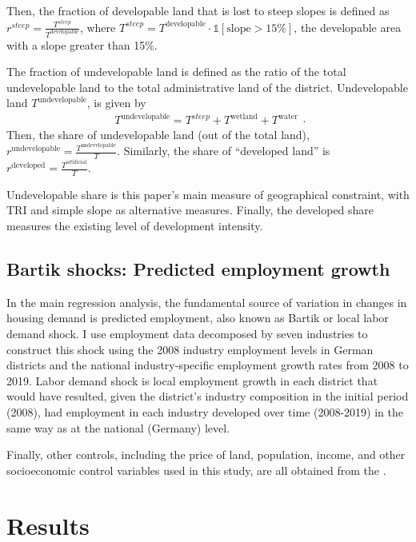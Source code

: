 \documentclass[
  12pt,
]{article}
\begin{document}
Then, the fraction of developable land that is lost to steep slopes is defined as \(r^{steep} = \frac{T^{steep}}{T^{\text{developable}}}\), where \(T^{steep} = T^{\text{developable}} \cdot\mathbb{1}\left[{\text{slope} > 15\%}\right]\), the developable area with a slope greater than 15\%.

The fraction of undevelopable land is defined as the ratio of the total undevelopable land to the total administrative land of the district. Undevelopable land \(T^{\text{undevelopable}}\), is given by \[
\begin{aligned}
T^{\text{undevelopable}} = T^{steep} + T^{\text{wetland}} + T^{\text{water}}
\end{aligned}.
\] Then, the share of undevelopable land (out of the total land), \(r^{\text{undevelopable}} = \frac{T^{\text{undevelopable}}}{T}\). Similarly, the share of ``developed land'' is \(r^{\text{developed}} = \frac{T^{\text{artificial}}}{T}\).

Undevelopable share is this paper's main measure of geographical constraint, with TRI and simple slope as alternative measures. Finally, the developed share measures the existing level of development intensity.

\subsection{Bartik shocks: Predicted employment growth}\label{bartik-shocks-predicted-employment-growth}

In the main regression analysis, the fundamental source of variation in changes in housing demand is predicted employment, also known as Bartik or local labor demand shock. I use employment data decomposed by seven industries to construct this shock using the 2008 industry employment levels in German districts and the national industry-specific employment growth rates from 2008 to 2019. Labor demand shock is local employment growth in each district that would have resulted, given the district's industry composition in the initial period (2008), had employment in each industry developed over time (2008-2019) in the same way as at the national (Germany) level.

Finally, other controls, including the price of land, population, income, and other socioeconomic control variables used in this study, are all obtained from the \citet{atlasde2022}.

\section{Results}\label{results}
\end{document}
